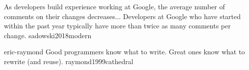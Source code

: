 \documentclass{article}
\begin{document}
  {As developers build experience working at Google, the average number of comments on their changes decreases... Developers at Google who have started within the past year typically have more than twice as many comments per change.}
  {sadowski2018modern}

\qte
  {eric-raymond}
  {Good programmers know what to write. Great ones know what to rewrite (and reuse).}
  {raymond1999cathedral}






\end{document}
